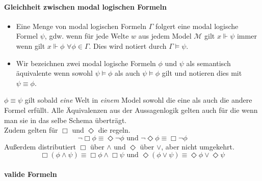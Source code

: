 \paragraph{Gleichheit zwischen modal logischen Formeln} %
\label{par:gleichheit}
%
\begin{definition}
	\label{def:model_folgert}
	\begin{itemize}
		\item Eine Menge von modal logischen Formeln $\Gamma$ folgert eine modal logische Formel $\psi$, gdw. wenn für jede Welte $w$ aus jedem Model $\mathcal{M}$ gilt $x \Vdash \psi$ immer wenn gilt $x \Vdash \phi$ $\forall \phi \in \Gamma$. 
		Dies wird notiert durch $\Gamma \vDash \psi$.
		\item Wir bezeichnen zwei modal logische Formeln $\phi$ und $\psi$ als semantisch äquivalente wenn sowohl $\psi \vDash \phi$ als auch $\psi \vDash \phi$ gilt und notieren dies mit $\psi \equiv \phi$.\\
		\cite[S.313]{huth2004logic}
	\end{itemize}	
\end{definition}
%
$\phi \equiv \psi$ gilt sobald \emph{eine} Welt in \emph{einem} Model sowohl die eine als auch die andere Formel erfüllt.
Alle Äquivalenzen aus der Aussagenlogik gelten auch für die \ML wenn man sie in das selbe Schema überträgt.\\
Zudem gelten für $\Box$ und $\Diamond$ die \deMorganRegeln regeln.\\
\begin{equation}
	\neg \Box \phi \equiv \Diamond \neg \phi \text{ und } \neg \Diamond \phi \equiv \Box \neg \phi
\end{equation}
%
\curr
Außerdem distributiert $\Box$ über $\wedge$ und $\Diamond$ über $\vee$, aber nicht umgekehrt. \cite[S.314]{huth2004logic}
\begin{equation}
	\Box(\phi \wedge \psi) \equiv \Box \phi \wedge \Box \psi \text{ und }
	\Diamond(\phi \vee \psi) \equiv \Diamond \phi \vee \Diamond \psi
\end{equation}



\paragraph{valide Formeln} %
\label{par:paragraph_name}

